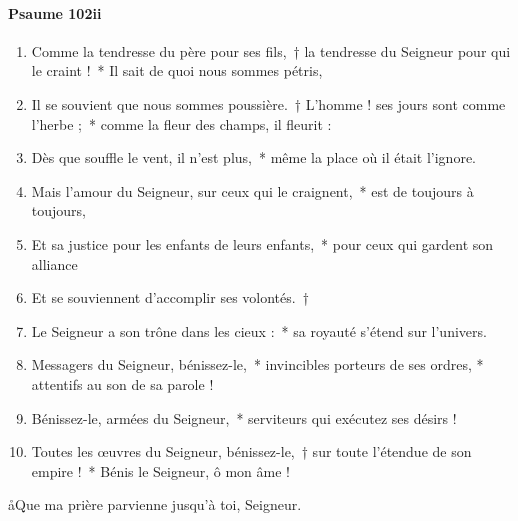 \documentclass[twoside]{article}
\begin{document}
\begin{paracol}[1]{2}
\paragraph{Psaume 102ii}
\begin{enumerate}[wide, itemsep=0mm, labelwidth=!, labelindent=0pt, label=\color{gregoriocolor}\theenumi]
\item Comme la tendresse du père pour ses fils,~† la tendresse du Seigneur pour qui le craint !~* Il sait de quoi nous sommes pétris,
\item Il se souvient que nous sommes poussière.~† L'homme ! ses jours sont comme l'herbe ;~* comme la fleur des champs, il fleurit :
\item Dès que souffle le vent, il n'est plus,~* même la place où il était l'ignore.
\item Mais l'amour du Seigneur, sur ceux qui le craignent,~* est de toujours à toujours,
\item Et sa justice pour les enfants de leurs enfants,~* pour ceux qui gardent son alliance
\item Et se souviennent d'accomplir ses volontés.~†
\item Le Seigneur a son trône dans les cieux :~* sa royauté s'étend sur l'univers.
\item Messagers du Seigneur, bénissez-le,~* invincibles porteurs de ses ordres, * attentifs au son de sa parole !
\item Bénissez-le, armées du Seigneur,~* serviteurs qui exécutez ses désirs !
\item Toutes les œuvres du Seigneur, bénissez-le,~† sur toute l'étendue de son empire !~* Bénis le Seigneur, ô mon âme !
\end{enumerate}
\switchcolumn*


\switchcolumn

\aa Que ma prière parvienne jusqu'à toi, Seigneur.

\switchcolumn*


\switchcolumn


\end{paracol}
\end{document}
